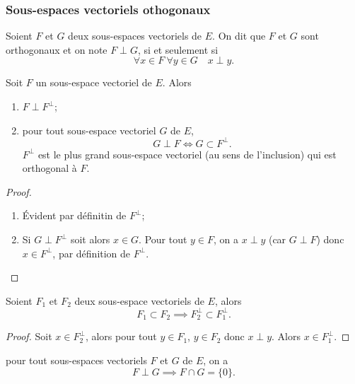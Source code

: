   \subsubsection{Sous-espaces vectoriels othogonaux}

  \begin{defdef}
    Soient \(F\) et \(G\) deux sous-espaces vectoriels de \(E\). On dit que \(F\) et \(G\) sont orthogonaux et on note \(F \perp G\), si et seulement si
    \begin{equation}
      \forall x \in F \ \forall y \in G \quad x \perp y.
    \end{equation}
  \end{defdef}
  \begin{prop}
    Soit \(F\) un sous-espace vectoriel de \(E\). Alors
    \begin{enumerate}
      \item \(F \perp F^\perp\);
      \item pour tout sous-espace vectoriel \(G\) de \(E\),
        \begin{equation}
          G \perp F \iff G \subset F^\perp.
        \end{equation}
        \(F^\perp\) est le plus grand sous-espace vectoriel (au sens de l'inclusion) qui est orthogonal à \(F\).
    \end{enumerate}
  \end{prop}
  \begin{proof}
    \begin{enumerate}
      \item Évident par définitin de \(F^\perp\);
      \item Si \(G \perp F^\perp\) soit alors \(x \in G\). Pour tout \(y \in F\), on a \(x \perp y\) (car \(G \perp F\)) donc \(x \in F^\perp\), par définition de \(F^\perp\).
    \end{enumerate}
  \end{proof}
  \begin{prop}
    Soient \(F_1\) et \(F_2\) deux sous-espace vectoriels de \(E\), alors
    \begin{equation}
      F_1 \subset F_2 \implies F_2^\perp \subset F_1^\perp.
    \end{equation}
  \end{prop}
  \begin{proof}
    Soit \(x \in F_2^\perp\), alors pour tout \(y \in F_1\), \(y \in F_2\) donc \(x \perp y\). Alors \(x \in F_1^\perp\).
  \end{proof}
  \begin{prop}
    pour tout sous-espaces vectoriels \(F\) et \(G\) de \(E\), on a
    \begin{equation}
      F \perp G \implies F \cap G = \{0\}.
    \end{equation}
  \end{prop}
